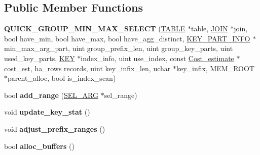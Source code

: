 \subsection*{Public Member Functions}
\begin{DoxyCompactItemize}
\item 
\mbox{\label{classQUICK__GROUP__MIN__MAX__SELECT_a76e0e41afb8ab852a4f57af6e34960bf}} 
{\bfseries Q\+U\+I\+C\+K\+\_\+\+G\+R\+O\+U\+P\+\_\+\+M\+I\+N\+\_\+\+M\+A\+X\+\_\+\+S\+E\+L\+E\+CT} (\mbox{\hyperlink{structTABLE}{T\+A\+B\+LE}} $\ast$table, \mbox{\hyperlink{classJOIN}{J\+O\+IN}} $\ast$join, bool have\+\_\+min, bool have\+\_\+max, bool have\+\_\+agg\+\_\+distinct, \mbox{\hyperlink{classKEY__PART__INFO}{K\+E\+Y\+\_\+\+P\+A\+R\+T\+\_\+\+I\+N\+FO}} $\ast$min\+\_\+max\+\_\+arg\+\_\+part, uint group\+\_\+prefix\+\_\+len, uint group\+\_\+key\+\_\+parts, uint used\+\_\+key\+\_\+parts, \mbox{\hyperlink{structst__key}{K\+EY}} $\ast$index\+\_\+info, uint use\+\_\+index, const \mbox{\hyperlink{classCost__estimate}{Cost\+\_\+estimate}} $\ast$cost\+\_\+est, ha\+\_\+rows records, uint key\+\_\+infix\+\_\+len, uchar $\ast$key\+\_\+infix, M\+E\+M\+\_\+\+R\+O\+OT $\ast$parent\+\_\+alloc, bool is\+\_\+index\+\_\+scan)
\item 
\mbox{\label{classQUICK__GROUP__MIN__MAX__SELECT_ab3e933e89b313f518b6b89b0c54563d4}} 
bool {\bfseries add\+\_\+range} (\mbox{\hyperlink{classSEL__ARG}{S\+E\+L\+\_\+\+A\+RG}} $\ast$sel\+\_\+range)
\item 
\mbox{\label{classQUICK__GROUP__MIN__MAX__SELECT_a48d1402db1280ca8a6e36e889491bb60}} 
void {\bfseries update\+\_\+key\+\_\+stat} ()
\item 
\mbox{\label{classQUICK__GROUP__MIN__MAX__SELECT_ab1068662fa79834a94cb7fbe22be301f}} 
void {\bfseries adjust\+\_\+prefix\+\_\+ranges} ()
\item 
\mbox{\label{classQUICK__GROUP__MIN__MAX__SELECT_ac85273673630dcfb037a64f9208a1a80}} 
bool {\bfseries alloc\+\_\+buffers} ()
\item 
\mbox{\label{classQUICK__GROUP__MIN__MAX__SELECT_ab63ad8b63212f529e83d162b4aa0122d}} 

\end{DoxyCompactItemize}
